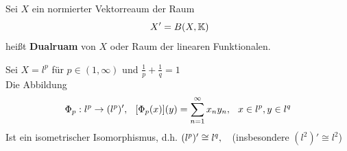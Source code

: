 \begin{definition} 
 Sei $X$ ein normierter Vektorreaum der Raum
 \[ X' = B(X, \MdK) \]	
 hei{\ss}t \textbf{Dualruam} von $X$ oder Raum der linearen Funktionalen.
\end{definition}

\begin{beispiel}
	Sei $X = l^{p}$ für $p \in (1, \infty)$ und $\frac{1}{p} + \frac{1}{q} = 1$ \\
	Die Abbildung
	\[ \Phi_{p} : l^{p} \rightarrow (l^{p})', \hspace{0.25cm} [\Phi_{p}(x)](y) = \sum_{n = 1}^{\infty} x_{n} y_{n}, \hspace{0.25cm} x \in l^{p}, y \in l^{q}  \]
	Ist ein isometrischer Isomorphismus, d.h.  $(l^{p})' \cong l^{q}, \hspace{0.25cm}$ (insbesondere $(l^{2})' \cong l^{2}$)
	

\end{beispiel}
